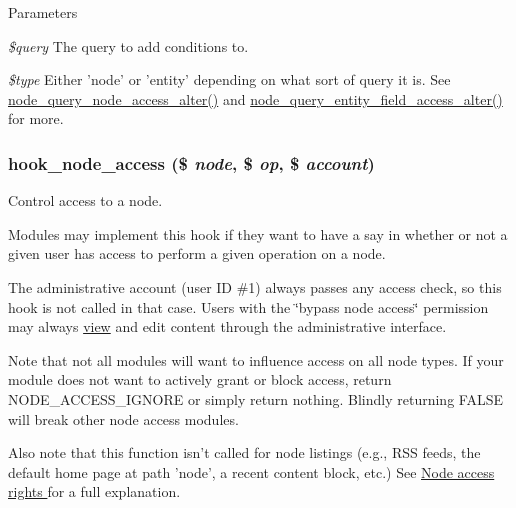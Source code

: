 \begin{DoxyParams}{Parameters}
\item[{\em \$query}]The query to add conditions to. \item[{\em \$type}]Either 'node' or 'entity' depending on what sort of query it is. See \hyperlink{group__node__access_gaef7c83544718b8431d81b884ef8cc6f5}{node\_\-query\_\-node\_\-access\_\-alter()} and \hyperlink{group__node__access_gacd4162ac9ee2d2147d5212fd5e7a7319}{node\_\-query\_\-entity\_\-field\_\-access\_\-alter()} for more. \end{DoxyParams}
\hypertarget{group__node__access_ga75a280ea1fbe0fb6ca034f8aad06d58d}{
\subsubsection[{hook\_\-node\_\-access}]{\setlength{\rightskip}{0pt plus 5cm}hook\_\-node\_\-access (\$ {\em node}, \/  \$ {\em op}, \/  \$ {\em account})}}
\label{group__node__access_ga75a280ea1fbe0fb6ca034f8aad06d58d}
Control access to a node.

Modules may implement this hook if they want to have a say in whether or not a given user has access to perform a given operation on a node.

The administrative account (user ID \#1) always passes any access check, so this hook is not called in that case. Users with the \char`\"{}bypass node access\char`\"{} permission may always \hyperlink{classview}{view} and edit content through the administrative interface.

Note that not all modules will want to influence access on all node types. If your module does not want to actively grant or block access, return NODE\_\-ACCESS\_\-IGNORE or simply return nothing. Blindly returning FALSE will break other node access modules.

Also note that this function isn't called for node listings (e.g., RSS feeds, the default home page at path 'node', a recent content block, etc.) See \hyperlink{group__node__access}{Node access rights } for a full explanation.


